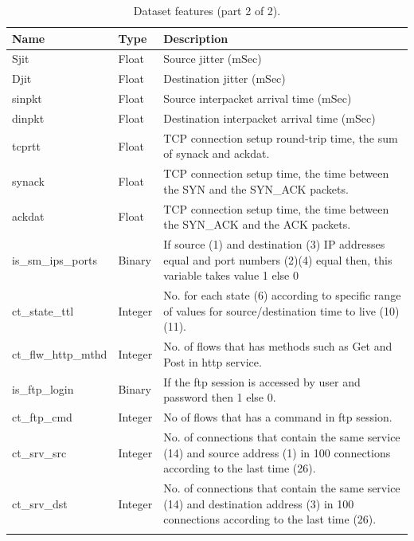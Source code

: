\documentclass[conference, 10pt]{IEEEtran}
\begin{document}
\begin{table}[H]
    \caption{Dataset features (part 2 of 2).}\label{tab:features2}
    \scriptsize
    \setlength{\tabcolsep}{3pt}
    \renewcommand{\arraystretch}{1.1}
    \begin{tabularx}{\columnwidth}{@{}>{\ttfamily}l l >{\raggedright\arraybackslash}X@{}}
    \toprule
    \textbf{Name} & \textbf{Type} & \textbf{Description} \\
    \midrule
    Sjit & Float & Source jitter (mSec) \\ \addlinespace[4pt]
    Djit & Float & Destination jitter (mSec) \\ \addlinespace[4pt]
    sinpkt & Float & Source interpacket arrival time (mSec) \\ \addlinespace[4pt]
    dinpkt & Float & Destination interpacket arrival time (mSec) \\ \addlinespace[4pt]
    tcprtt & Float & TCP connection setup round-trip time, the sum of synack and ackdat. \\ \addlinespace[4pt]
    synack & Float & TCP connection setup time, the time between the SYN and the SYN\_ACK packets. \\ \addlinespace[4pt]
    ackdat & Float & TCP connection setup time, the time between the SYN\_ACK and the ACK packets. \\ \addlinespace[4pt]
    is\_sm\_ips\_ports & Binary & If source (1) and destination (3) IP addresses equal and port numbers (2)(4) equal then, this variable takes value 1 else 0 \\ \addlinespace[4pt]
    ct\_state\_ttl & Integer & No. for each state (6) according to specific range of values for source/destination time to live (10) (11). \\ \addlinespace[4pt]
    ct\_flw\_http\_mthd & Integer & No. of flows that has methods such as Get and Post in http service. \\ \addlinespace[4pt]
    is\_ftp\_login & Binary & If the ftp session is accessed by user and password then 1 else 0. \\ \addlinespace[4pt]
    ct\_ftp\_cmd & Integer & No of flows that has a command in ftp session. \\ \addlinespace[4pt]
    ct\_srv\_src & Integer & No. of connections that contain the same service (14) and source address (1) in 100 connections according to the last time (26). \\ \addlinespace[4pt]
    ct\_srv\_dst & Integer & No. of connections that contain the same service (14) and destination address (3) in 100 connections according to the last time (26). \\ \addlinespace[4pt]

\end{tabularx}
\end{table}
\end{document}
